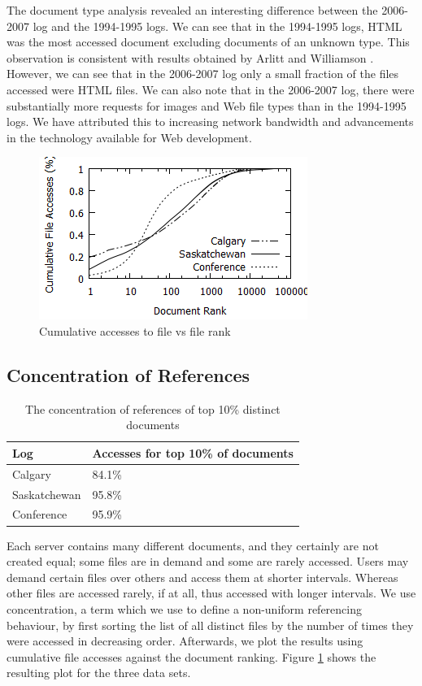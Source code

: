 \documentclass[10pt,conference]{IEEEtran}
\begin{document}
The document type analysis revealed an interesting difference between the 2006-2007 log and the 1994-1995 logs. We can see that in the 1994-1995 logs, HTML was the most accessed document excluding documents of an unknown type. This observation is consistent with results obtained by Arlitt and Williamson \cite{keynote}. However, we can see that in the 2006-2007 log only a small fraction of the files accessed were HTML files. We can also note that in the 2006-2007 log, there were substantially more requests for images and Web file types than in the 1994-1995 logs. We have attributed this to increasing network bandwidth and advancements in the technology available for Web development.

\begin{figure}[t]
    \includegraphics{images/concentration}
    \caption{Cumulative accesses to file vs file rank}\label{fig:file_accesses}
\end{figure}

\subsection{Concentration of References} %
\label{sub:concentration_of_references}
\begin{table}[h]
    \caption{The concentration of references of top 10\% distinct documents}\label{tab:conc_references}
    \begin{tabular}{l | l}
        Log & Accesses for top 10\% of documents\\
        \hline
        Calgary & 84.1\%\\
        Saskatchewan & 95.8\%\\
        Conference & 95.9\%
    \end{tabular}
\end{table}
Each server contains many different documents, and they certainly are not created equal; some files are in demand and some are rarely accessed. Users may demand certain files over others and access them at shorter intervals. Whereas other files are accessed rarely, if at all, thus accessed with longer intervals. We use concentration, a term which we use to define a non-uniform referencing behaviour, by first sorting the list of all distinct files by the number of times they were accessed in decreasing order. Afterwards, we plot the results using cumulative file accesses against the document ranking. Figure \ref{fig:file_accesses} shows the resulting plot for the three data sets.
\end{document}
